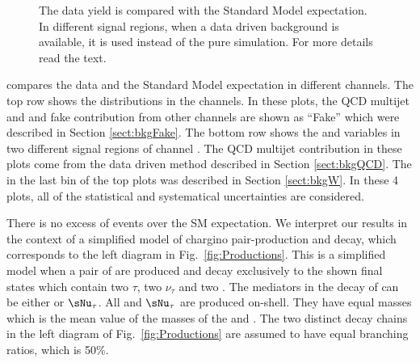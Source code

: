 \begin{figure}[!Hhtb]
\caption{The data yield is compared with the Standard Model expectation. In different signal regions, 
when a data driven background is available, it is used instead of the pure simulation. For more details read the text.}
\label{fig:yield_final}
\end{figure}
compares the data and the Standard Model expectation in different channels. The top row 
shows the \mttwo distributions in the \leptonTau channels. 
In these plots, the QCD multijet and \wjets and fake contribution from other channels are shown 
as ``Fake'' which were described in Section \ref{sect:bkgFake}.
The bottom row shows the \mttwo and \SumMT variables in two different signal regions of \tauTau channel . 
The QCD multijet contribution in these plots come from the data driven method described in 
Section \ref{sect:bkgQCD}. The \wjets in the last bin of the top plots was described in Section \ref{sect:bkgW}. 
In these 4 plots, all of the statistical and systematical uncertainties are considered.

There is no excess of events over the SM expectation.  We interpret our results in the context
of a simplified model of chargino pair-production and decay, which corresponds to the left
diagram in Fig.~\ref{fig:Productions}. This is a simplified model when a pair of \chione 
are produced and decay exclusively to the shown final states which contain two $\tau$, two $\nu_{\tau}$ and two \PSGczDo.
The mediators in the decay of \chione can be either \sTau or $\sNu_{\tau}$. All  \sTau and $\sNu_{\tau}$ 
are produced  on-shell. They have equal masses which is the mean value of the masses of the \chione   and \PSGczDo.
The two distinct decay chains in the left diagram of Fig.~\ref{fig:Productions} are assumed to have equal branching ratios, which is 50\%.

